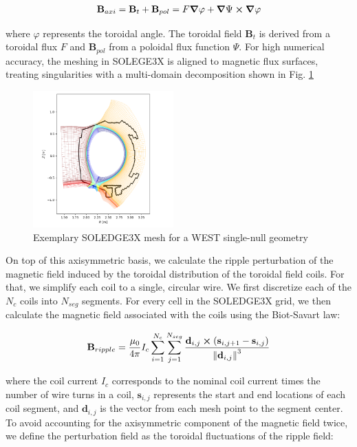 \begin{equation}
	\textbf{B}_{axi} = \textbf{B}_t + \textbf{B}_{pol} = F\grad{\varphi} + \grad{\Psi}\cross\grad{\varphi} \label{eq:axiSymBfield}
\end{equation}

where $\varphi$ represents the toroidal angle. The toroidal field $\textbf{B}_t$ is derived from a toroidal flux $F$ and $\textbf{B}_{pol}$ from a poloidal flux function $\Psi$. For high numerical accuracy, the meshing in SOLEGE3X is aligned to magnetic flux surfaces, treating singularities with a multi-domain decomposition shown in Fig. \ref{fig:WESTmesh} \newline 

\begin{figure}[H]\centering
	\centering
	\includegraphics[width=0.48\textwidth]{schemes/WESTmesh.png}
	\caption[Exemplary SOLEDGE3X mesh for a WEST single-null geometry ]{Exemplary SOLEDGE3X mesh for a WEST single-null geometry }
	\label{fig:WESTmesh}
\end{figure}

On top of this axisymmetric basis, we calculate the ripple perturbation of the magnetic field induced by the toroidal distribution of the toroidal field coils. For that, we simplify each coil to a single, circular wire. We first discretize each of the $N_{c}$ coils into $N_{seg}$ segments. For every cell in the SOLEDGE3X grid, we then calculate the magnetic field associated with the coils using the Biot-Savart law:

\begin{equation}
	\textbf{B}_{ripple} = \frac{\mu_0}{4\pi}I_c\sum_{i=1}^{N_{c}}\sum_{j=1}^{N_{seg}}\frac{\textbf{d}_{i,j}\cross\left(\textbf{s}_{i,j+1} - \textbf{s}_{i,j}\right)}{\norm{\textbf{d}_{i,j}}^3}
\end{equation}

where the coil current $I_c$ corresponds to the nominal coil current times the number of wire turns in a coil, $\textbf{s}_{i,j}$ represents the start and end locations of each coil segment, and $\textbf{d}_{i,j}$ is the vector from each mesh point to the segment center. To avoid accounting for the axisymmetric component of the magnetic field twice, we define the perturbation field as the toroidal fluctuations of the ripple field:


